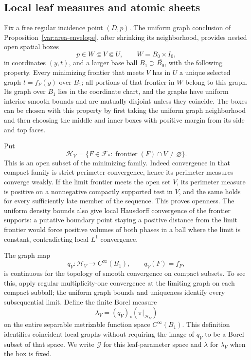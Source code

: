 \subsection{Local leaf measures and atomic sheets}

Fix a free regular incidence point $(D,p)$.  The uniform graph conclusion
of Proposition~\ref{var:area-envelope}, after shrinking its neighborhood,
provides nested open spatial boxes
\[
 p\in W\Subset V\Subset U,
 \qquad W=B_0\times I_0,
\]
in coordinates $(y,t)$, and a larger base ball $B_1\supset\overline{B_0}$,
with the following property.  Every minimizing frontier that meets $V$
has in $U$ a unique selected graph $t=f_F(y)$ over $B_1$; all portions of
that frontier in $W$ belong to this graph.  Its graph over $B_1$ lies in
the coordinate chart, and the graphs have uniform interior smooth
bounds and are mutually disjoint unless they coincide.  The boxes can
be chosen with this property by first taking the uniform graph
neighborhood and then choosing the middle and inner boxes with positive
margin from its side and top faces.

Put
\[
 \mathcal H_V=\{F\in\mathcal F_*:
                         \operatorname{frontier}(F)\cap V\ne\varnothing\}.
\]
This is an open subset of the minimizing family.  Indeed convergence
in that compact family is strict perimeter convergence, hence its
perimeter measures converge weakly.  If the limit frontier meets the
open set $V$, its perimeter measure is positive on a nonnegative
compactly supported test in $V$, and the same holds for every sufficiently
late member of the sequence.  This proves openness.  The uniform density
bounds also give local Hausdorff convergence of the frontier supports:
a putative boundary point staying a positive distance from the limit
frontier would force positive volumes of both phases in a ball where
the limit is constant, contradicting local $L^1$ convergence.

The graph map
\[
 q_V:\mathcal H_V\longrightarrow C^\infty(B_1),\qquad q_V(F)=f_F,
\]
is continuous for the topology of smooth convergence on compact
subsets.  To see this, apply regular multiplicity-one convergence at
the limiting graph on each compact subball; the uniform graph bounds
and uniqueness identify every subsequential limit.  Define the finite
Borel measure
\[
 \lambda_V=(q_V)_*(\pi|_{\mathcal H_V})
\]
on the entire separable metrizable function space $C^\infty(B_1)$.
This definition identifies coincident local graphs without requiring
the image of $q_V$ to be a Borel subset of that space.  We write
$\mathcal G$ for this leaf-parameter space and $\lambda$ for
$\lambda_V$ when the box is fixed.

